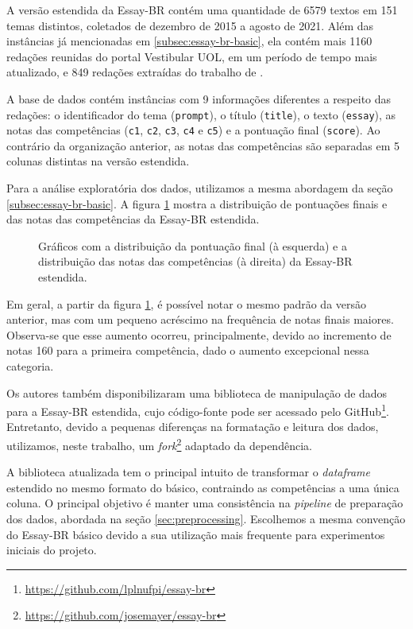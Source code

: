 A versão estendida da Essay-BR contém uma quantidade de 6579 textos em 151 temas distintos, coletados de dezembro de 2015 a agosto de 2021. Além das instâncias já mencionadas em \ref{subsec:essay-br-basic}, ela contém mais 1160 redações reunidas do portal Vestibular UOL, em um período de tempo mais atualizado, e 849 redações extraídas do trabalho de \citet{amorim-et-al-2017}.

A base de dados contém instâncias com 9 informações diferentes a respeito das redações: o identificador do tema (\texttt{prompt}), o título (\texttt{title}), o texto (\texttt{essay}), as notas das competências (\texttt{c1}, \texttt{c2}, \texttt{c3}, \texttt{c4} e \texttt{c5}) e a pontuação final (\texttt{score}). Ao contrário da organização anterior, as notas das competências são separadas em 5 colunas distintas na versão estendida.

Para a análise exploratória dos dados, utilizamos a mesma abordagem da seção \ref{subsec:essay-br-basic}. A figura \ref{fig:essay-br-extended-analysis} mostra a distribuição de pontuações finais e das notas das competências da Essay-BR estendida.

\begin{figure}[H]
    \caption{Gráficos com a distribuição da pontuação final (à esquerda) e a distribuição das notas das competências (à direita) da Essay-BR estendida.}
    \label{fig:essay-br-extended-analysis}
    \centering
    \resizebox{\textwidth}{!}{}
\end{figure}

Em geral, a partir da figura \ref{fig:essay-br-extended-analysis}, é possível notar o mesmo padrão da versão anterior, mas com um pequeno acréscimo na frequência de notas finais maiores. Observa-se que esse aumento ocorreu, principalmente, devido ao incremento de notas 160 para a primeira competência, dado o aumento excepcional nessa categoria.

Os autores \citet{marinho-et-al-22} também disponibilizaram uma biblioteca de manipulação de dados para a Essay-BR estendida, cujo código-fonte pode ser acessado pelo GitHub\footnote{\url{https://github.com/lplnufpi/essay-br}}. Entretanto, devido a pequenas diferenças na formatação e leitura dos dados, utilizamos, neste trabalho, um \textit{fork}\footnote{\url{https://github.com/josemayer/essay-br}} adaptado da dependência.

A biblioteca atualizada tem o principal intuito de transformar o \textit{dataframe} estendido no mesmo formato do básico, contraindo as competências a uma única coluna. O principal objetivo é manter uma consistência na \textit{pipeline} de preparação dos dados, abordada na seção \ref{sec:preprocessing}. Escolhemos a mesma convenção do Essay-BR básico devido a sua utilização mais frequente para experimentos iniciais do projeto.

